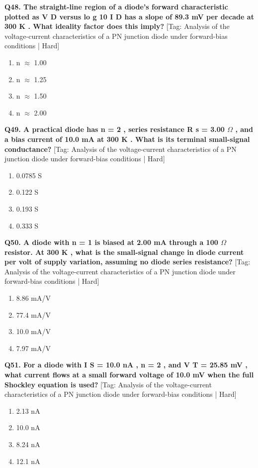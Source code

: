 \noindent\textbf{Q48. The straight-line region of a diode's forward characteristic plotted as V D versus lo g 10 I D has a slope of 89.3 mV per decade at 300 K . What ideality factor does this imply?} \hfill [Tag: Analysis of the voltage-current characteristics of a PN junction diode under forward-bias conditions | Hard]
\begin{enumerate}[label=(\alph*),topsep=2pt,itemsep=1pt,partopsep=0pt,parsep=0pt]
    \item {n $\approx$ 1.00}
    \item {n $\approx$ 1.25}
    \item {n $\approx$ 1.50}
    \item {n $\approx$ 2.00}
\end{enumerate}
\vspace{2mm}

\noindent\textbf{Q49. A practical diode has n = 2 , series resistance R s = 3.00 $\Omega$ , and a bias current of 10.0 mA at 300 K . What is its terminal small-signal conductance?} \hfill [Tag: Analysis of the voltage-current characteristics of a PN junction diode under forward-bias conditions | Hard]
\begin{enumerate}[label=(\alph*),topsep=2pt,itemsep=1pt,partopsep=0pt,parsep=0pt]
    \item {0.0785 S}
    \item {0.122 S}
    \item {0.193 S}
    \item {0.333 S}
\end{enumerate}
\vspace{2mm}

\noindent\textbf{Q50. A diode with n = 1 is biased at 2.00 mA through a 100 $\Omega$ resistor. At 300 K , what is the small-signal change in diode current per volt of supply variation, assuming no diode series resistance?} \hfill [Tag: Analysis of the voltage-current characteristics of a PN junction diode under forward-bias conditions | Hard]
\begin{enumerate}[label=(\alph*),topsep=2pt,itemsep=1pt,partopsep=0pt,parsep=0pt]
    \item {8.86 mA/V}
    \item {77.4 mA/V}
    \item {10.0 mA/V}
    \item {7.97 mA/V}
\end{enumerate}
\vspace{2mm}

\noindent\textbf{Q51. For a diode with I S = 10.0 nA , n = 2 , and V T = 25.85 mV , what current flows at a small forward voltage of 10.0 mV when the full Shockley equation is used?} \hfill [Tag: Analysis of the voltage-current characteristics of a PN junction diode under forward-bias conditions | Hard]
\begin{enumerate}[label=(\alph*),topsep=2pt,itemsep=1pt,partopsep=0pt,parsep=0pt]
    \item {2.13 nA}
    \item {10.0 nA}
    \item {8.24 nA}
    \item {12.1 nA}
\end{enumerate}
\vspace{2mm}

